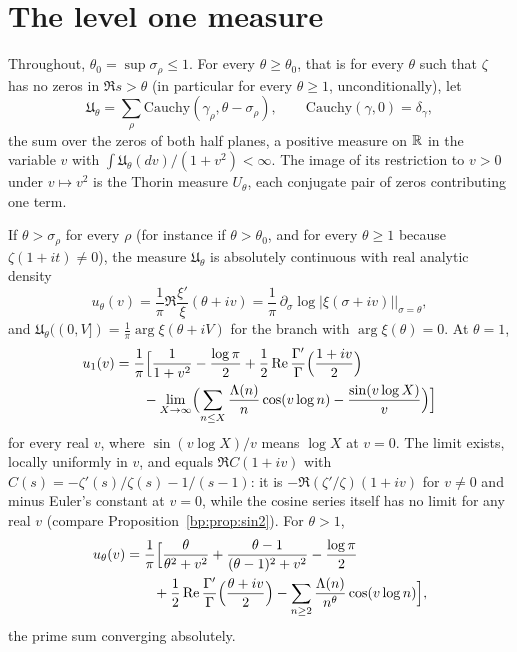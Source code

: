 \section{The level one measure}\label{lo:sec:level}

Throughout, $\theta_0=\sup\sigma_\rho\le1$. For every $\theta\ge\theta_0$, that is for every $\theta$ such that $\zeta$ has no zeros in $\Re s>\theta$ (in particular for every $\theta\ge1$, unconditionally), let
\begin{equation}\label{lo:eq:Utheta}
\mathfrak U_\theta=\sum_{\rho}\mathrm{Cauchy}(\gamma_\rho,\theta-\sigma_\rho),\qquad\mathrm{Cauchy}(\gamma,0)=\delta_\gamma,
\end{equation}
the sum over the zeros of both half planes, a positive measure on $\R$ in the variable $v$ with $\int\mathfrak U_\theta(dv)/(1+v^2)<\infty$. The image of its restriction to $v>0$ under $v\mapsto v^2$ is the Thorin measure $U_\theta$, each conjugate pair of zeros contributing one term.

\begin{theorem}[density of the Thorin measure; at $\theta=1$, $v\ne0$, Propositions~\ref{bp:prop:thorin} and~\ref{bp:prop:sin2}]\label{lo:thm:density}
If $\theta>\sigma_\rho$ for every $\rho$ (for instance if $\theta>\theta_0$, and for every $\theta\ge1$ because $\zeta(1+it)\ne0$), the measure $\mathfrak U_\theta$ is absolutely continuous with real analytic density
\begin{equation}\label{lo:eq:dens}
u_\theta(v)=\frac1\pi\Re\frac{\xi'}{\xi}(\theta+iv)=\frac1\pi\,\partial_\sigma\log|\xi(\sigma+iv)|\Big|_{\sigma=\theta},
\end{equation}
and $\mathfrak U_\theta((0,V])=\frac1\pi\arg\xi(\theta+iV)$ for the branch with $\arg\xi(\theta)=0$. At $\theta=1$,
\begin{equation}\label{lo:eq:u1}
\begin{split}u_1(v)&=\frac1\pi\Bigl[\frac1{1+v^2}-\frac{\log\pi}2+\frac12\Re\frac{\Gamma'}{\Gamma}\Bigl(\frac{1+iv}2\Bigr)\\&\qquad-\lim_{X\to\infty}\Bigl(\sum_{n\le X}\frac{\Lambda(n)}{n}\cos(v\log n)-\frac{\sin(v\log X)}{v}\Bigr)\Bigr]\end{split}
\end{equation}
for every real $v$, where $\sin(v\log X)/v$ means $\log X$ at $v=0$. The limit exists, locally uniformly in $v$, and equals $\Re C(1+iv)$ with $C(s)=-\zeta'(s)/\zeta(s)-1/(s-1)$: it is $-\Re(\zeta'/\zeta)(1+iv)$ for $v\ne0$ and minus Euler's constant at $v=0$, while the cosine series itself has no limit for any real $v$ (compare Proposition~\ref{bp:prop:sin2}). For $\theta>1$,
\[
\begin{split}u_\theta(v)&=\frac1\pi\Bigl[\frac\theta{\theta^2+v^2}+\frac{\theta-1}{(\theta-1)^2+v^2}-\frac{\log\pi}2\\&\qquad+\frac12\Re\frac{\Gamma'}{\Gamma}\Bigl(\frac{\theta+iv}2\Bigr)-\sum_{n\ge2}\frac{\Lambda(n)}{n^\theta}\cos(v\log n)\Bigr],\end{split}
\]
the prime sum converging absolutely.
\end{theorem}

